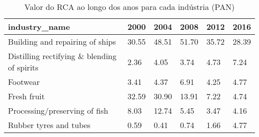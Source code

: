 \begin{table}
\centering
\caption{Valor do RCA ao longo dos anos para cada indústria (PAN)}
\begin{tabular}{p{6cm}p{1.5cm}p{1.5cm}p{1.5cm}p{1.5cm}p{1.5cm}}
\toprule
                              industry\_name &  2000 &  2004 &  2008 &  2012 &  2016 \\
\midrule
            Building and repairing of ships & 30.55 & 48.51 & 51.70 & 35.72 & 28.39 \\
Distilling rectifying \& blending of spirits &  2.36 &  4.05 &  3.74 &  4.73 &  7.24 \\
                                   Footwear &  3.41 &  4.37 &  6.91 &  4.25 &  4.77 \\
                                Fresh fruit & 32.59 & 30.90 & 13.91 &  7.22 &  4.74 \\
              Processing/preserving of fish &  8.03 & 12.74 &  5.45 &  3.47 &  4.16 \\
                     Rubber tyres and tubes &  0.59 &  0.41 &  0.74 &  1.66 &  4.77 \\
\bottomrule
\end{tabular}
\end{table}
